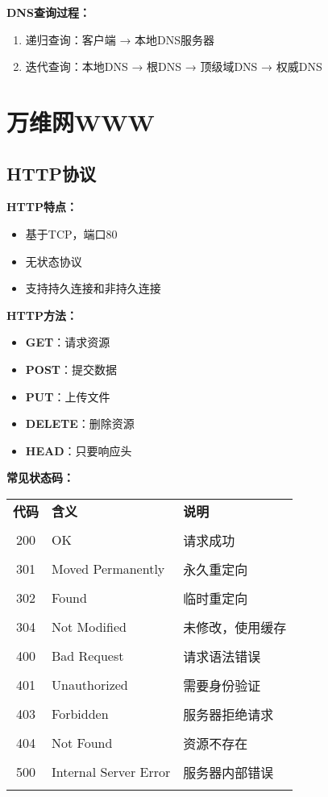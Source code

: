 \documentclass[lang=cn,newtx,10pt,scheme=chinese]{../../elegantbook}
\begin{document}
\textbf{DNS查询过程：}
\begin{enumerate}
  \item 递归查询：客户端 → 本地DNS服务器
  \item 迭代查询：本地DNS → 根DNS → 顶级域DNS → 权威DNS
\end{enumerate}

\section{万维网WWW}

\subsection{HTTP协议}

\textbf{HTTP特点：}
\begin{itemize}
  \item 基于TCP，端口80
  \item 无状态协议
  \item 支持持久连接和非持久连接
\end{itemize}

\textbf{HTTP方法：}
\begin{itemize}
  \item \textbf{GET}：请求资源
  \item \textbf{POST}：提交数据
  \item \textbf{PUT}：上传文件
  \item \textbf{DELETE}：删除资源
  \item \textbf{HEAD}：只要响应头
\end{itemize}

\textbf{常见状态码：}
\begin{longtable}{@{}clp{6cm}@{}}
\toprule
\textbf{代码} & \textbf{含义} & \textbf{说明} \\\\ \midrule
\endhead

200 & OK & 请求成功 \\\\
301 & Moved Permanently & 永久重定向 \\\\
302 & Found & 临时重定向 \\\\
304 & Not Modified & 未修改，使用缓存 \\\\
400 & Bad Request & 请求语法错误 \\\\
401 & Unauthorized & 需要身份验证 \\\\
403 & Forbidden & 服务器拒绝请求 \\\\
404 & Not Found & 资源不存在 \\\\
500 & Internal Server Error & 服务器内部错误 \\\\

\bottomrule
\end{longtable}
\end{document}
